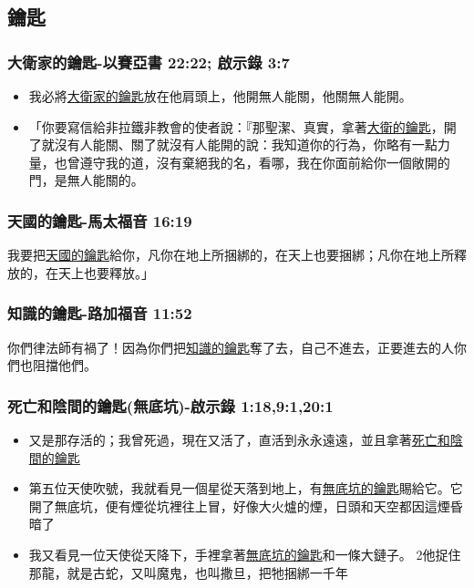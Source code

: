 \subsection{鑰匙}

\subsubsection{大衛家的鑰匙-以賽亞書 22:22; 啟示錄 3:7}
\begin{itemize} 
\itemsep-.25em
\item 我必將\underline{大衛家的鑰匙}放在他肩頭上，他開無人能關，他關無人能開。
\item 「你要寫信給非拉鐵非教會的使者說：『那聖潔、真實，拿著\underline{大衛的鑰匙}，開了就沒有人能關、關了就沒有人能開的說：我知道你的行為，你略有一點力量，也曾遵守我的道，沒有棄絕我的名，看哪，我在你面前給你一個敞開的門，是無人能關的。
\end{itemize} 

\subsubsection{天國的鑰匙-馬太福音 16:19}
我要把\underline{天國的鑰匙}給你，凡你在地上所捆綁的，在天上也要捆綁；凡你在地上所釋放的，在天上也要釋放。」

\subsubsection{知識的鑰匙-路加福音 11:52}
你們律法師有禍了！因為你們把\underline{知識的鑰匙}奪了去，自己不進去，正要進去的人你們也阻擋他們。


\subsubsection{死亡和陰間的鑰匙(無底坑)-啟示錄 1:18,9:1,20:1}
\begin{itemize} 
\itemsep-.25em
\item 又是那存活的；我曾死過，現在又活了，直活到永永遠遠，並且拿著\underline{死亡和陰間的鑰匙} 
\item 第五位天使吹號，我就看見一個星從天落到地上，有\underline{無底坑的鑰匙}賜給它。它開了無底坑，便有煙從坑裡往上冒，好像大火爐的煙，日頭和天空都因這煙昏暗了
\item 我又看見一位天使從天降下，手裡拿著\underline{無底坑的鑰匙}和一條大鏈子。 2他捉住那龍，就是古蛇，又叫魔鬼，也叫撒旦，把牠捆綁一千年
\end{itemize} 




